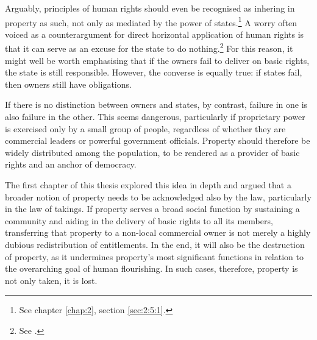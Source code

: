 Arguably, principles of human rights should even be recognised as inhering in property as such, not only as mediated by the power of states.\footnote{See chapter \ref{chap:2}, section \ref{sec:2:5:1}.} A worry often voiced as a counterargument for direct horizontal application of human rights is that it can serve as an excuse for the state to do nothing.\footnote{See \cite[110]{manisuli07}.} For this reason, it might well be worth emphasising that if the owners fail to deliver on basic rights, the state is still responsible. However, the converse is equally true: if states fail, then owners still have obligations.

If there is no distinction between owners and states, by contrast, failure in one is also failure in the other. This seems dangerous, particularly if proprietary power is exercised only by a small group of people, regardless of whether they are commercial leaders or powerful government officials. Property should therefore be widely distributed among the population, to be rendered as a provider of basic rights and an anchor of democracy.

The first chapter of this thesis explored this idea in depth and argued that a broader notion of property needs to be acknowledged also by the law, particularly in the law of takings. If property serves a broad social function by sustaining a community and aiding in the delivery of basic rights to all its members, transferring that property to a non-local commercial owner is not merely a highly dubious redistribution of entitlements. In the end, it will also be the destruction of property, as it undermines property's most significant functions in relation to the overarching goal of human flourishing. In such cases, therefore, property is not only taken, it is lost.

